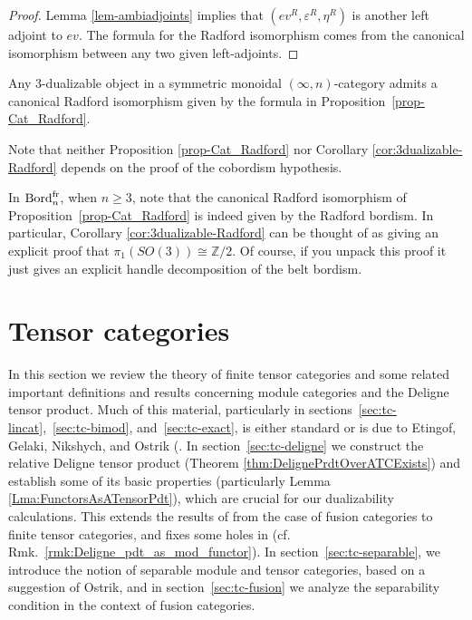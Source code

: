 \documentclass{amsart}
\begin{document}
\begin{proof}
	Lemma \ref{lem-ambiadjoints} implies that $(ev^R, \varepsilon^R, \eta^R)$ is another left adjoint to $ev$. The formula for the Radford isomorphism comes from the canonical isomorphism between any two given left-adjoints. 
\end{proof}


\begin{corollary} \label{cor:3dualizable-Radford}
	Any 3-dualizable object in a symmetric monoidal $(\infty,n)$-category admits a canonical Radford isomorphism given by the formula in Proposition~\ref{prop-Cat_Radford}. 
\end{corollary}

Note that neither Proposition \ref{prop-Cat_Radford} nor Corollary \ref{cor:3dualizable-Radford} depends on the proof of the cobordism hypothesis.

\begin{example}
	In $\mathrm{Bord}^\mathrm{fr}_n$, when $n \geq 3$, note that the canonical Radford isomorphism of Proposition~\ref{prop-Cat_Radford} is indeed given by the Radford bordism.  In particular, Corollary \ref{cor:3dualizable-Radford} can be thought of as giving an explicit proof that $\pi_1(SO(3)) \cong \mathbb{Z}/2$.  Of course, if you unpack this proof it just gives an explicit handle decomposition of the belt bordism.
\end{example}

\section{Tensor categories} \label{sec:tc}

In this section we review the theory of finite tensor categories and some related important definitions and results concerning module categories and the Deligne tensor product.  Much of this material, particularly in sections~\ref{sec:tc-lincat},~\ref{sec:tc-bimod}, and~\ref{sec:tc-exact}, is either standard or is due to Etingof, Gelaki, Nikshych, and Ostrik (\cite{MR1976459,MR2183279,MR2097289, 0909.3140, EGNO}.  In section~\ref{sec:tc-deligne} we construct the relative Deligne tensor product (Theorem \ref{thm:DelignePrdtOverATCExists})
and establish some of its basic properties (particularly Lemma \ref{Lma:FunctorsAsATensorPdt}), which are crucial for our dualizability calculations.  This extends the results of \cite{0909.3140} from the case of fusion categories to finite tensor categories, and fixes some holes in \cite{0911.4979} (cf. Rmk.~\ref{rmk:Deligne_pdt_as_mod_functor}).
In section~\ref{sec:tc-separable}, we introduce the notion of separable module and tensor categories, based on a suggestion of Ostrik, and in section~\ref{sec:tc-fusion} we analyze the separability condition in the context of fusion categories.
\end{document}
